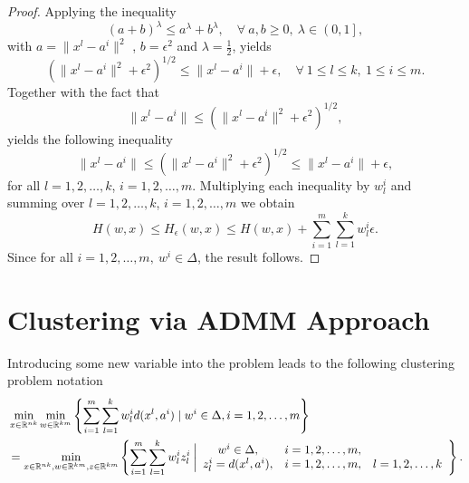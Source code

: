 \documentclass[11pt]{article}
\numberwithin{equation}{section}
\begin{document}
\begin{proof}
Applying the inequality
\begin{equation*}
	\left( a+b \right)^{\lambda} \leq a^{\lambda} + b^{\lambda}, \quad \forall \: a,b \geq 0, \: \lambda \in \left( 0,1 \right] ,
\end{equation*}
with $a = \|x^l - a^i \|^2$ , $b = {\epsilon}^2$ and $\lambda = \frac{1}{2}$, yields
\begin{equation*}
	\left(\|x^l - a^i \|^2 + {\epsilon}^2 \right)^{1/2} \leq \|x^l - a^i \| + \epsilon , \quad \forall \: 1 \leq l \leq k, \: 1 \leq i \leq m .
\end{equation*}
Together with the fact that
\begin{equation*}
	\|x^l - a^i \| \leq \left(\|x^l - a^i \|^2 + {\epsilon}^2 \right)^{1/2},
\end{equation*}
yields the following inequality
\begin{equation*}
	\|x^l - a^i \| \leq \left(\|x^l - a^i \|^2 + {\epsilon}^2 \right)^{1/2} \leq \|x^l - a^i \| + \epsilon ,
\end{equation*}
for all $l=1,2, \ldots, k$, $i=1,2, \ldots, m$.
Multiplying each inequality by $w^i_l$ and summing over $l=1,2, \ldots, k$, $i=1,2, \ldots, m$ we obtain
\begin{equation*}
	H(w,x) \leq H_{\epsilon}(w,x) \leq H(w,x) + \sum\limits_{i=1}^m \sum\limits_{l=1}^k w^i_l \epsilon .
\end{equation*}
Since for all $i=1,2, \dots, m, \: w^i \in \Delta$, the result follows.
\end{proof}

\newpage

\section{Clustering via ADMM Approach}
Introducing some new variable into the problem leads to the following clustering problem notation
\begin{equation*}
\begin{split}
	&\min\limits_{x \in \mathbb{R}^{nk}} \min\limits_{w \in \mathbb{R}^{km}} \left\lbrace \sum\limits_{i=1}^{m} \sum\limits_{l=1}^{k} w^i_l d(x^l,a^i) \mid w^i \in \Delta, i=1,2, \ldots, m \right\rbrace \\
	&= \min\limits_{x \in \mathbb{R}^{nk}, w \in \mathbb{R}^{km}, z \in \mathbb{R}^{km}} \left\lbrace \sum\limits_{i=1}^{m} \sum\limits_{l=1}^{k} w^i_l z^i_l \: \bigg| 
\begin{array}{c c c}
 w^i \in \Delta, & i=1,2, \ldots, m, & \\
 z^i_l = d(x^l,a^i), & i=1,2, \ldots, m, & l=1,2, \ldots, k
\end{array}
\right\rbrace .
\end{split}
\end{equation*}
\end{document}
